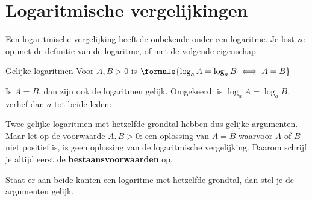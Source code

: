 \begin{oefeningen}

\end{oefeningen}

\section{Logaritmische vergelijkingen}

Een logaritmische vergelijking heeft de onbekende onder een logaritme. Je lost ze op met de definitie van de logaritme, of met de volgende eigenschap.

\begin{theorie}
\begin{stelling}{Gelijke logaritmen}
Voor $A, B > 0$ is \qquad $\formule{\log_a A = \log_a B \iff A = B}$
\end{stelling}
\begin{bewijs}
Is $A = B$, dan zijn ook de logaritmen gelijk. Omgekeerd: is $\log_a A = \log_a B$, verhef dan $a$ tot beide leden:
\end{bewijs}
\end{theorie}

Twee gelijke logaritmen met hetzelfde grondtal hebben dus gelijke argumenten. Maar let op de voorwaarde $A, B > 0$: een oplossing van $A = B$ waarvoor $A$ of $B$ niet positief is, is geen oplossing van de logaritmische vergelijking. Daarom schrijf je altijd eerst de \textbf{bestaansvoorwaarden} op.


\begin{oefeningen}
\end{oefeningen}

Staat er aan beide kanten een logaritme met hetzelfde grondtal, dan stel je de argumenten gelijk.

